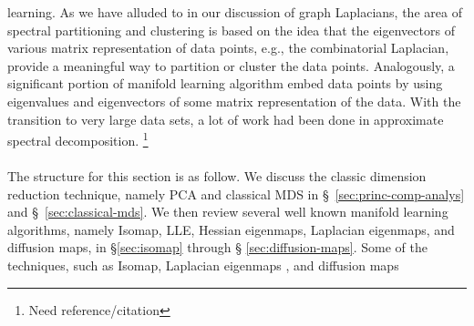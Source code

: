 learning. As we have alluded to in our discussion of graph Laplacians,
the area of spectral partitioning and clustering is based on the idea
that the eigenvectors of various matrix representation of data points,
e.g., the combinatorial Laplacian, provide a meaningful way to
partition or cluster the data points. Analogously, a significant portion
of manifold learning algorithm embed data points by using eigenvalues
and eigenvectors of some matrix representation of the data. With the
transition to very large data sets, a lot of work had been done in
approximate spectral decomposition. \footnote{Need reference/citation}
\\ \\
%
%
The structure for this section is as follow. We discuss the classic
dimension reduction technique, namely PCA and classical MDS in
 \S~\ref{sec:princ-comp-analys} and \S~\ref{sec:classical-mds}. 
 We then review several well known manifold learning
algorithms, namely Isomap, LLE, Hessian eigenmaps, Laplacian
eigenmaps, and diffusion maps, in \S \ref{sec:isomap} through \S
\ref{sec:diffusion-maps}. Some of the techniques, such as Isomap,
Laplacian eigenmaps \citep{belkin03:_laplac}, and diffusion maps
